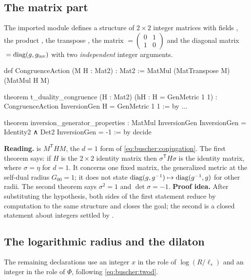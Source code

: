 \subsection{The matrix part}
The imported module  defines a structure
 of $2\times2$ integer matrices with fields , the product
, the transpose , the matrix
${}=\left(\begin{smallmatrix}0&1\\1&0\end{smallmatrix}\right)$ and the
diagonal matrix ${}=\operatorname{diag}(g,g_{\rm inv})$ with two \emph{independent}
integer arguments.

\begin{leanbox}
\begin{leancode}
def CongruenceAction (M H : Mat2) : Mat2 :=
  MatMul (MatTranspose M) (MatMul H M)

theorem t_duality_congruence (H : Mat2) (hH : H = GenMetric 1 1) :
    CongruenceAction InversionGen H = GenMetric 1 1 := by ...

theorem inversion_generator_properties :
    MatMul InversionGen InversionGen = Identity2 ∧ Det2 InversionGen = -1 := by
  decide
\end{leancode}
\textbf{Reading.}  is $M^{\mathsf T}HM$, the $d=1$ form of
\eqref{eq:buscher:conjugation}. The first theorem says: if $H$ is the $2\times2$ identity
matrix then $\sigma^{\mathsf T}H\sigma$ is the identity matrix, where
$\sigma=\eta$ for $d=1$. It concerns one fixed matrix, the generalized metric at the self-dual
radius $G_{00}=1$; it does not state $\operatorname{diag}(g,g^{-1})\mapsto\operatorname{diag}(g^{-1},g)$ for other radii.
The second theorem says $\sigma^2=1$ and $\det\sigma=-1$.
\textbf{Proof idea.} After substituting the hypothesis, both sides of the first statement
reduce by computation to the same structure and  closes the goal; the second is a
closed statement about integers settled by . \TA
\end{leanbox}

\subsection{The logarithmic radius and the dilaton}
The remaining declarations use an integer $x$ in the role of $\log(R/\ell_s)$ and an integer
 in the role of $\Phi$, following \eqref{eq:buscher:twod}.

